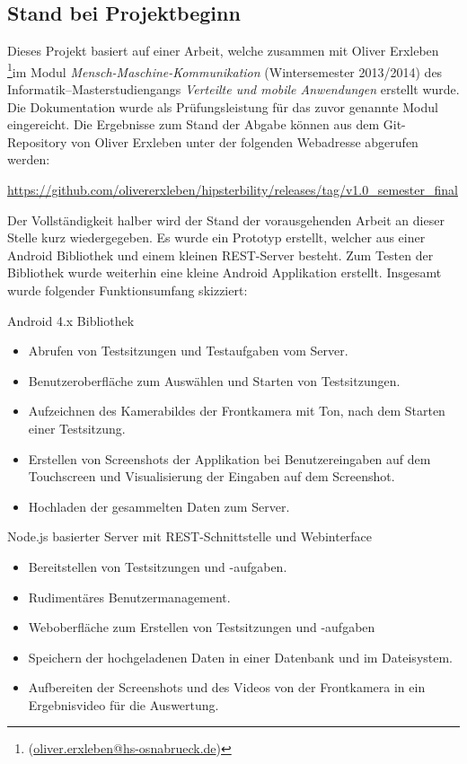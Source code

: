 \subsection{Stand bei Projektbeginn\label{subsec:stand_bei_projektbeginn}}
Dieses Projekt basiert auf einer Arbeit, welche zusammen mit Oliver Erxleben \footnote{(\href{mailto:oliver.erxleben@hs-osnabrueck.de}{oliver.erxleben@hs-osnabrueck.de})}im Modul \emph{Mensch-Maschine-Kommunikation} (Wintersemester 2013/2014) des Informatik--Masterstudiengangs \emph{Verteilte und mobile Anwendungen} erstellt wurde.
Die Dokumentation  \cite{Erxleben.2014} wurde als Prü\-fung\-slei\-stung für das zuvor genannte Modul eingereicht.
Die Ergebnisse zum Stand der Abgabe können aus dem Git-Repository von Oliver Erxleben unter der folgenden Webadresse abgerufen werden:

\url{https://github.com/olivererxleben/hipsterbility/releases/tag/v1.0_semester_final}

Der Vollständigkeit halber wird der Stand der vorausgehenden Arbeit an dieser Stelle kurz wiedergegeben.
Es wurde ein Prototyp erstellt, welcher aus einer Android Bibliothek und einem kleinen \ac{REST}-Server besteht.
Zum Testen der Bibliothek wurde weiterhin eine kleine Android Applikation erstellt.
Insgesamt wurde folgender Funktionsumfang skizziert:
\begin{compactitem}
	\item Android 4.x Bibliothek
	\begin{itemize}
		\item Abrufen von Testsitzungen und Testaufgaben vom Server.
		\item Benutzeroberfläche zum Auswählen und Starten von Testsitzungen.
		\item Aufzeichnen des Kamerabildes der Frontkamera mit Ton, nach dem Starten einer Testsitzung.
		\item Erstellen von Screenshots der Applikation bei Benutzereingaben auf dem Touchscreen und Visualisierung der Eingaben auf dem Screenshot.
		\item Hochladen der gesammelten Daten zum Server.
	\end{itemize}
	\item Node.js basierter Server mit REST-Schnittstelle und Webinterface
	\begin{itemize}
		\item Bereitstellen von Testsitzungen und -aufgaben.
		\item Rudimentäres Benutzermanagement.
		\item Weboberfläche zum Erstellen von Testsitzungen und -aufgaben
		\item Speichern der hochgeladenen Daten in einer Datenbank und im Dateisystem.
		\item Aufbereiten der Screenshots und des Videos von der Frontkamera in ein Ergebnisvideo für die Auswertung.
	\end{itemize}
\end{compactitem}

